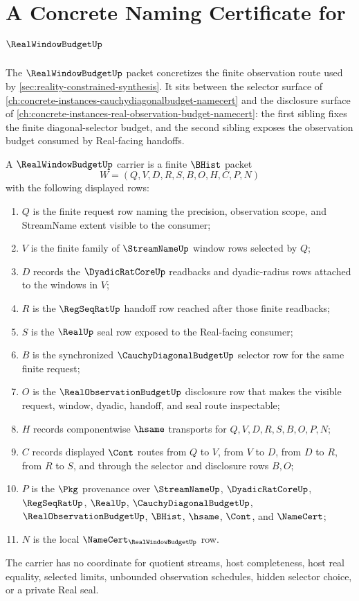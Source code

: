 \chapter{A Concrete Naming Certificate for $\RealWindowBudgetUp$}
\label{ch:concrete-instances-realwindowbudget-namecert}

The $\RealWindowBudgetUp$ packet concretizes the finite observation route used by \autoref{sec:reality-constrained-synthesis}. It sits between the selector surface of \autoref{ch:concrete-instances-cauchydiagonalbudget-namecert} and the disclosure surface of \autoref{ch:concrete-instances-real-observation-budget-namecert}: the first sibling fixes the finite diagonal-selector budget, and the second sibling exposes the observation budget consumed by Real-facing handoffs.

\begin{definition}
\label{def:real-window-budget-carrier}
A $\RealWindowBudgetUp$ carrier is a finite $\BHist$ packet
$$
W=(Q,V,D,R,S,B,O,H,C,P,N)
$$
with the following displayed rows:
\begin{enumerate}
\item $Q$ is the finite request row naming the precision, observation scope, and StreamName extent visible to the consumer;
\item $V$ is the finite family of $\StreamNameUp$ window rows selected by $Q$;
\item $D$ records the $\DyadicRatCoreUp$ readbacks and dyadic-radius rows attached to the windows in $V$;
\item $R$ is the $\RegSeqRatUp$ handoff row reached after those finite readbacks;
\item $S$ is the $\RealUp$ seal row exposed to the Real-facing consumer;
\item $B$ is the synchronized $\CauchyDiagonalBudgetUp$ selector row for the same finite request;
\item $O$ is the $\RealObservationBudgetUp$ disclosure row that makes the visible request, window, dyadic, handoff, and seal route inspectable;
\item $H$ records componentwise $\hsame$ transports for $Q,V,D,R,S,B,O,P,N$;
\item $C$ records displayed $\Cont$ routes from $Q$ to $V$, from $V$ to $D$, from $D$ to $R$, from $R$ to $S$, and through the selector and disclosure rows $B,O$;
\item $P$ is the $\Pkg$ provenance over $\StreamNameUp$, $\DyadicRatCoreUp$, $\RegSeqRatUp$, $\RealUp$, $\CauchyDiagonalBudgetUp$, $\RealObservationBudgetUp$, $\BHist$, $\hsame$, $\Cont$, and $\NameCert$;
\item $N$ is the local $\NameCert_{\RealWindowBudgetUp}$ row.
\end{enumerate}
The carrier has no coordinate for quotient streams, host completeness, host real equality, selected limits, unbounded observation schedules, hidden selector choice, or a private Real seal.
\end{definition}

